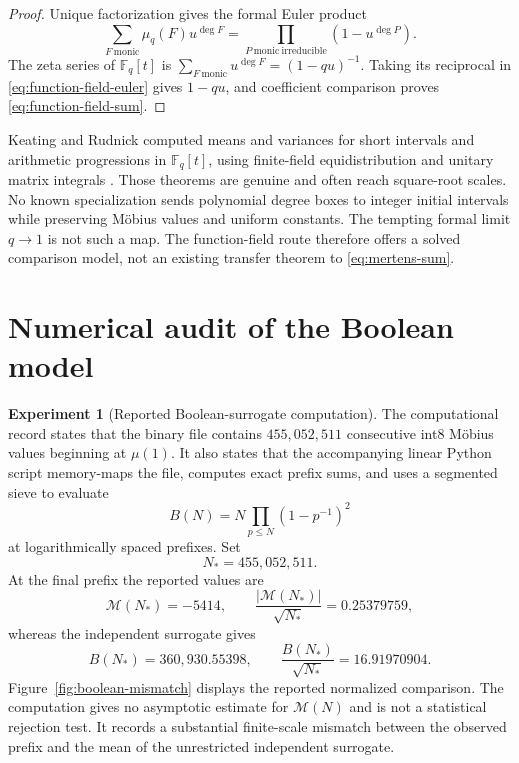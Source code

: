 \documentclass[11pt]{amsart}
\numberwithin{equation}{section}
\theoremstyle{plain}
\theoremstyle{definition}
\newtheorem{experiment}[theorem]{Experiment}
\theoremstyle{remark}
\newcommand{\Mertens}{\mathcal M}
\newcommand{\F}{\mathbb F}
\begin{document}
\begin{proof}
Unique factorization gives the formal Euler product
\begin{equation}\label{eq:function-field-euler}
 \sum_{F\ \mathrm{monic}}\mu_q(F)u^{\deg F}
 =\prod_{P\ \mathrm{monic\ irreducible}}(1-u^{\deg P}).
\end{equation}
The zeta series of \(\F_q[t]\) is
\(
 \sum_{F\ \mathrm{monic}}u^{\deg F}=(1-qu)^{-1}.
\)
Taking its reciprocal in \eqref{eq:function-field-euler} gives \(1-qu\), and
coefficient comparison proves \eqref{eq:function-field-sum}.
\end{proof}

Keating and Rudnick computed means and variances for short intervals and
arithmetic progressions in \(\F_q[t]\), using finite-field equidistribution and
unitary matrix integrals \cite{KeatingRudnick2016}.  Those theorems are genuine
and often reach square-root scales.  No known specialization sends polynomial
degree boxes to integer initial intervals while preserving M\"obius values and
uniform constants.  The tempting formal limit \(q\to1\) is not such a map.
The function-field route therefore offers a solved comparison model, not an
existing transfer theorem to \eqref{eq:mertens-sum}.

\section{Numerical audit of the Boolean model}\label{sec:numerics}

\begin{experiment}[Reported Boolean-surrogate computation]
\label{exp:boolean-surrogate}
The computational record states that the binary file contains
\(455{,}052{,}511\) consecutive int8 M\"obius values beginning at \(\mu(1)\).
It also states that the accompanying linear Python script memory-maps the file,
computes exact prefix sums, and uses a segmented sieve to evaluate
\begin{equation}\label{eq:model-prefix}
  B(N)=N\prod_{p\leq N}(1-p^{-1})^2
\end{equation}
at logarithmically spaced prefixes.  Set
\begin{equation}
  N_*=455{,}052{,}511.
  \label{eq:numerical-final-prefix}
\end{equation}
At the final prefix the reported values are
\begin{equation}\label{eq:final-numerics}
  \Mertens(N_*)=-5414,
  \qquad \frac{|\Mertens(N_*)|}{\sqrt {N_*}}=0.25379759,
\end{equation}
whereas the independent surrogate gives
\begin{equation}\label{eq:boolean-final}
  B(N_*)=360{,}930.55398,
  \qquad \frac{B(N_*)}{\sqrt {N_*}}=16.91970904.
\end{equation}
Figure~\ref{fig:boolean-mismatch} displays the reported normalized comparison.
The computation gives no asymptotic estimate for \(\Mertens(N)\) and is not a
statistical rejection test.  It records a substantial finite-scale mismatch
between the observed prefix and the mean of the unrestricted independent
surrogate.
\end{experiment}
\end{document}
